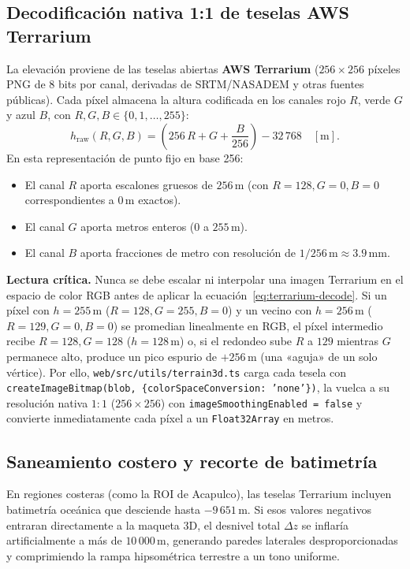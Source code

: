 \documentclass[11pt,a4paper]{article}
\newcommand{\src}[1]{\nolinkurl{#1}}
\newcommand{\unit}[1]{\mathrm{#1}}
\newcommand{\warn}[1]{\par\noindent\colorbox{blue!8}{\parbox{.965\linewidth}{\textbf{Lectura crítica.} #1}}\par}
\begin{document}
\subsection{Decodificación nativa 1:1 de teselas AWS Terrarium}
\label{sec:relieve3d-terrarium}

La elevación proviene de las teselas abiertas \textbf{AWS Terrarium} ($256\times256$ píxeles PNG de 8 bits por
canal, derivadas de SRTM/NASADEM y otras fuentes públicas). Cada píxel almacena la altura codificada en los
canales rojo $R$, verde $G$ y azul $B$, con $R,G,B\in\{0,1,\ldots,255\}$:
\begin{equation}
  h_{\mathrm{raw}}(R,G,B) = \left(256\,R + G + \frac{B}{256}\right) - 32\,768\quad[\unit{m}].
  \label{eq:terrarium-decode}
\end{equation}
En esta representación de punto fijo en base 256:
\begin{itemize}
  \item El canal $R$ aporta escalones gruesos de $256\,\unit{m}$ (con $R=128, G=0, B=0$ correspondientes a
        $0\,\unit{m}$ exactos).
  \item El canal $G$ aporta metros enteros ($0$ a $255\,\unit{m}$).
  \item El canal $B$ aporta fracciones de metro con resolución de $1/256\,\unit{m}\approx 3.9\,\unit{mm}$.
\end{itemize}

\warn{Nunca se debe escalar ni interpolar una imagen Terrarium en el espacio de color RGB antes de aplicar la
ecuación~\eqref{eq:terrarium-decode}. Si un píxel con $h=255\,\unit{m}$ ($R=128,G=255,B=0$) y un vecino con
$h=256\,\unit{m}$ ($R=129,G=0,B=0$) se promedian linealmente en RGB, el píxel intermedio recibe $R=128,G=128$
($h=128\,\unit{m}$) o, si el redondeo sube $R$ a $129$ mientras $G$ permanece alto, produce un pico espurio
de $+256\,\unit{m}$ (una «aguja» de un solo vértice). Por ello, \src{web/src/utils/terrain3d.ts} carga cada
tesela con \texttt{createImageBitmap(blob, \{colorSpaceConversion: 'none'\})}, la vuelca a su resolución
nativa $1:1$ ($256\times256$) con \texttt{imageSmoothingEnabled = false} y convierte inmediatamente cada píxel
a un \texttt{Float32Array} en metros.}

\subsection{Saneamiento costero y recorte de batimetría}
\label{sec:relieve3d-saneamiento}

En regiones costeras (como la ROI de Acapulco), las teselas Terrarium incluyen batimetría oceánica que desciende
hasta $-9\,651\,\unit{m}$. Si esos valores negativos entraran directamente a la maqueta 3D, el desnivel total
$\Delta z$ se inflaría artificialmente a más de $10\,000\,\unit{m}$, generando paredes laterales desproporcionadas
y comprimiendo la rampa hipsométrica terrestre a un tono uniforme.
\end{document}
